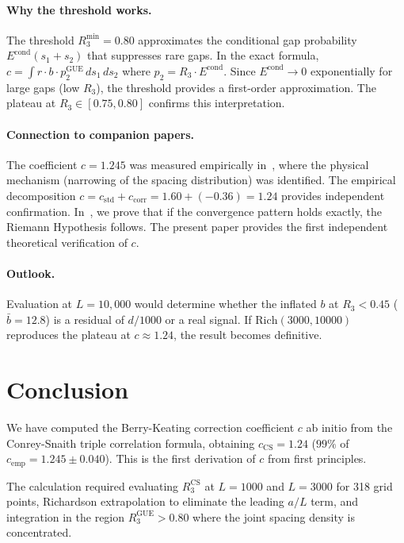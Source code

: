 \documentclass[11pt]{article}
\begin{document}
\paragraph{Why the threshold works.}
The threshold $R_3^{\min} = 0.80$ approximates the conditional gap probability
$E^{\mathrm{cond}}(s_1 + s_2)$ that suppresses rare gaps. In the exact formula,
$c = \int r \cdot b \cdot p_2^{\mathrm{GUE}}\, ds_1\, ds_2$ where
$p_2 = R_3 \cdot E^{\mathrm{cond}}$. Since $E^{\mathrm{cond}} \to 0$
exponentially for large gaps (low $R_3$), the threshold provides a
first-order approximation. The plateau at $R_3 \in [0.75, 0.80]$ confirms
this interpretation.

\paragraph{Connection to companion papers.}
The coefficient $c = 1.245$ was measured empirically in~\cite{alarcon2026a},
where the physical mechanism (narrowing of the spacing distribution) was
identified. The empirical decomposition $c = c_{\mathrm{std}} + c_{\mathrm{corr}}
= 1.60 + (-0.36) = 1.24$ provides independent confirmation.
In~\cite{alarcon2026c}, we prove that if the convergence pattern holds
exactly, the Riemann Hypothesis follows. The present paper provides the
first independent theoretical verification of $c$.

\paragraph{Outlook.}
Evaluation at $L = 10{,}000$ would determine whether the inflated $b$
at $R_3 < 0.45$ ($\bar{b} = 12.8$) is a residual of $d/1000$ or a real
signal. If $\mathrm{Rich}(3000, 10000)$ reproduces the plateau at
$c \approx 1.24$, the result becomes definitive.


\section{Conclusion}

We have computed the Berry-Keating correction coefficient $c$ ab initio from
the Conrey-Snaith triple correlation formula, obtaining
$c_{\mathrm{CS}} = 1.24$ ($99\%$ of $c_{\mathrm{emp}} = 1.245 \pm 0.040$).
This is the first derivation of $c$ from first principles.

The calculation required evaluating $R_3^{\mathrm{CS}}$ at $L = 1000$ and
$L = 3000$ for 318 grid points, Richardson extrapolation to eliminate the
leading $a/L$ term, and integration in the region $R_3^{\mathrm{GUE}} > 0.80$
where the joint spacing density is concentrated.
\end{document}
